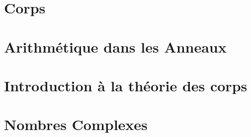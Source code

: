 \chapter{Corps}


\chapter{Arithmétique dans les Anneaux}


\chapter{Introduction à la théorie des corps}


\chapter{Nombres Complexes}


